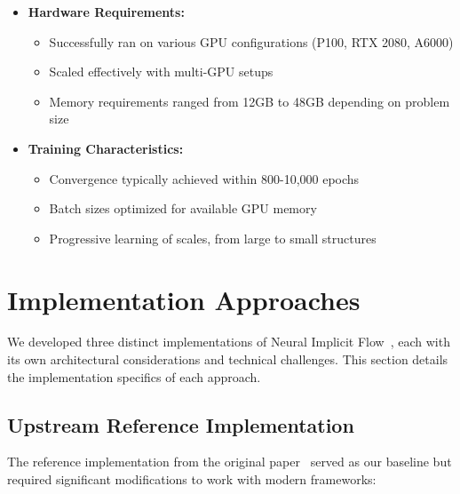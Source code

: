 \documentclass[10pt,journal,compsoc,onecolumn]{IEEEtran}
\begin{document}
\begin{itemize}
    \item \textbf{Hardware Requirements:}
    \begin{itemize}
        \item Successfully ran on various GPU configurations (P100, RTX 2080, A6000)
        \item Scaled effectively with multi-GPU setups
        \item Memory requirements ranged from 12GB to 48GB depending on problem size
    \end{itemize}
    
    \item \textbf{Training Characteristics:}
    \begin{itemize}
        \item Convergence typically achieved within 800-10,000 epochs
        \item Batch sizes optimized for available GPU memory
        \item Progressive learning of scales, from large to small structures
    \end{itemize}
\end{itemize}

\section{Implementation Approaches}
We developed three distinct implementations of Neural Implicit Flow~\cite{nif2023}, each with its own architectural considerations and technical challenges. This section details the implementation specifics of each approach.

\subsection{Upstream Reference Implementation}
The reference implementation from the original paper~\cite{nif2023} served as our baseline but required significant modifications to work with modern frameworks:
\end{document}
